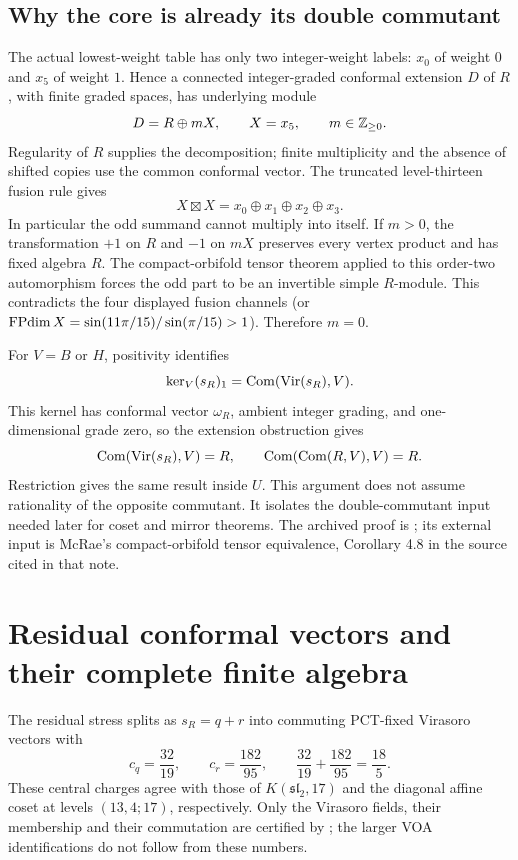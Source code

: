 \subsection{Why the core is already its double commutant}
\label{expstructure:core-maximality}

The actual lowest-weight table has only two integer-weight labels:
$x_0$ of weight $0$ and $x_5$ of weight $1$. Hence a connected
integer-graded conformal extension $D$ of $R$, with finite graded
spaces, has underlying module
\[
 D=R\oplus mX,\qquad X=x_5,\qquad m\in\mathbb Z_{\geq0}.
\]
Regularity of $R$ supplies the decomposition; finite multiplicity
and the absence of shifted copies use the common conformal vector.
The truncated level-thirteen fusion rule gives
\[
 X\boxtimes X=x_0\oplus x_1\oplus x_2\oplus x_3.
\]
In particular the odd summand cannot multiply into itself. If
$m>0$, the transformation $+1$ on $R$ and $-1$ on $mX$ preserves
every vertex product and has fixed algebra $R$. The compact-orbifold
tensor theorem applied to this order-two automorphism forces the
odd part to be an invertible simple $R$-module. This contradicts
the four displayed fusion channels (or
$\operatorname{FPdim} X=\sin(11\pi/15)/\sin(\pi/15)>1$). Therefore $m=0$.

For $V=B$ or $H$, positivity identifies
\[
 \ker_V(s_R)_1=\operatorname{Com}(\operatorname{Vir}(s_R),V).
\]
This kernel has conformal vector $\omega_R$, ambient integer grading,
and one-dimensional grade zero, so the extension obstruction gives
\[
 \operatorname{Com}(\operatorname{Vir}(s_R),V)=R,
 \qquad \operatorname{Com}(\operatorname{Com}(R,V),V)=R.
\]
Restriction gives the same result inside $U$. This argument does
not assume rationality of the opposite commutant. It isolates the
double-commutant input needed later for coset and mirror theorems.
The archived proof is
; its
external input is McRae's compact-orbifold tensor equivalence,
Corollary 4.8 in the source cited in that note.

\section{Residual conformal vectors and their complete finite algebra}
\label{expstructure:residual}

The residual stress splits as $s_R=q+r$ into commuting PCT-fixed
Virasoro vectors with
\[
 c_q=\frac{32}{19},\qquad c_r=\frac{182}{95},\qquad
 \frac{32}{19}+\frac{182}{95}=\frac{18}5.
\]
These central charges agree with those of $K(\mathfrak{sl}_2,17)$
and the diagonal affine coset at levels $(13,4;17)$, respectively.
Only the Virasoro fields, their membership and their commutation
are certified by
; the larger
VOA identifications do not follow from these numbers.

